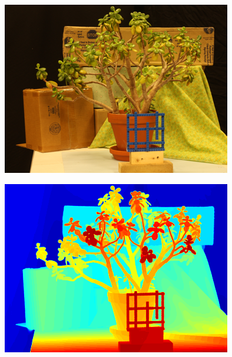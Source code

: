 \documentclass[a0,landscape]{a0poster}
\begin{document}
\begin{multicols}{4}
{ \centering
  \begin{minipage}{0.45\columnwidth}
    \centering
    \includegraphics[width=\textwidth]{./Images/Jadeplant/optical.png}%
  \end{minipage}\hfill %
  \begin{minipage}{0.45\columnwidth}
    \centering
    \includegraphics[width=\textwidth]{./Images/Jadeplant/lidar.png}
  \end{minipage}
  \label{fig:Jadeplantfig1}
}


\end{multicols}
\end{document}

